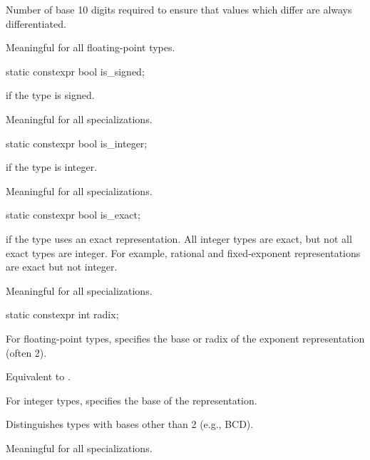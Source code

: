\begin{itemdescr}
\pnum
Number of base 10 digits required to ensure that values which
differ are always differentiated.

\pnum
Meaningful for all floating-point types.
\end{itemdescr}

%
\begin{itemdecl}
static constexpr bool is_signed;
\end{itemdecl}

\begin{itemdescr}
\pnum
{} if the type is signed.

\pnum
Meaningful for all specializations.
\end{itemdescr}

%
\begin{itemdecl}
static constexpr bool is_integer;
\end{itemdecl}

\begin{itemdescr}
\pnum
{} if the type is integer.

\pnum
Meaningful for all specializations.
\end{itemdescr}

%
\begin{itemdecl}
static constexpr bool is_exact;
\end{itemdecl}

\begin{itemdescr}
\pnum
{} if the type uses an exact representation.
All integer types are exact, but not all exact types are integer.
For example, rational and fixed-exponent representations are exact but not integer.

\pnum
Meaningful for all specializations.
\end{itemdescr}

%
\begin{itemdecl}
static constexpr int radix;
\end{itemdecl}

\begin{itemdescr}
\pnum
For floating-point types, specifies the base or radix of the exponent representation
(often 2).
\begin{footnote}
Equivalent to .
\end{footnote}

\pnum
For integer types, specifies the base of the
representation.
\begin{footnote}
Distinguishes types with bases other than 2 (e.g., BCD).
\end{footnote}

\pnum
Meaningful for all specializations.
\end{itemdescr}

